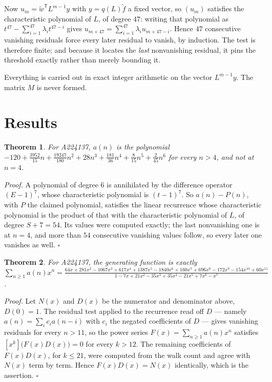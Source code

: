 \documentclass[11pt]{article}
\newtheorem{theorem}{Theorem}
\theoremstyle{definition}
\begin{document}
Now $u_m = \tilde w^{\mathsf T} L^{m-1} y$ with $y = q(L)\tilde f$ a fixed vector, so $(u_m)$ satisfies the characteristic polynomial of $L$, of degree $47$: writing that polynomial as $t^{47} - \sum_{i=1}^{47} \lambda_i t^{47-i}$ gives $u_{m+47} = \sum_{i=1}^{47} \lambda_i u_{m+47-i}$. Hence $47$ consecutive vanishing residuals force every later residual to vanish, by induction. The test is therefore finite; and because it locates the {\itshape last} nonvanishing residual, it pins the threshold exactly rather than merely bounding it.

Everything is carried out in exact integer arithmetic on the vector $L^{m-1}y$. The matrix $M$ is never formed.

\section{Results}

\begin{theorem} For A224137, $a(n)$ is the polynomial $-120 + \frac{3952}{15}n + \frac{19247}{180}n^{2} + 28n^{3} + \frac{181}{36}n^{4} + \frac{8}{15}n^{5} + \frac{2}{45}n^{6}$ for every $n > 4$, and not at $n = 4$.\end{theorem}

{\itshape Proof.} A polynomial of degree $6$ is annihilated by the difference operator $(E-1)^{7}$, whose characteristic polynomial is $(t-1)^{7}$. So $a(n) - P(n)$, with $P$ the claimed polynomial, satisfies the linear recurrence whose characteristic polynomial is the product of that with the characteristic polynomial of $L$, of degree $S + 7 = 54$. Its values were computed exactly; the last nonvanishing one is at $n = 4$, and more than $54$ consecutive vanishing values follow, so every later one vanishes as well. $\square$

\begin{theorem} For A224137, the generating function is exactly $\sum_{n\ge 1} a(n)x^n = \frac{64x + 281x^{2} - 1067x^{3} + 617x^{4} + 1387x^{5} - 1840x^{6} + 160x^{7} + 696x^{8} - 172x^{9} - 154x^{10} + 60x^{11}}{1 - 7x + 21x^{2} - 35x^{3} + 35x^{4} - 21x^{5} + 7x^{6} - x^{7}}$.\end{theorem}

{\itshape Proof.} Let $N(x)$ and $D(x)$ be the numerator and denominator above, $D(0)=1$. The residual test applied to the recurrence read off $D$ --- namely $a(n) = \sum_i c_i a(n-i)$ with $c_i$ the negated coefficients of $D$ --- gives vanishing residuals for every $n > 11$, so the power series $F(x)=\sum_{n\ge 1}a(n)x^n$ satisfies $[x^k]\bigl(F(x)D(x)\bigr) = 0$ for every $k > 12$. The remaining coefficients of $F(x)D(x)$, for $k \le 21$, were computed from the walk count and agree with $N(x)$ term by term. Hence $F(x)D(x) = N(x)$ identically, which is the assertion. $\square$
\end{document}
